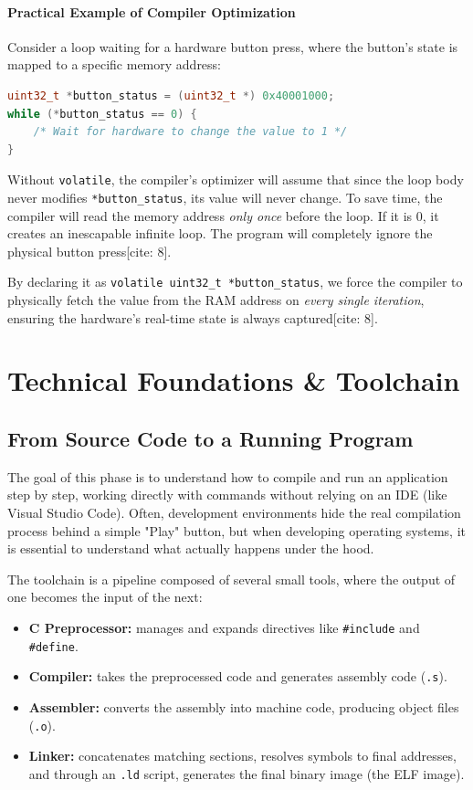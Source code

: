 \paragraph{Practical Example of Compiler Optimization}
Consider a loop waiting for a hardware button press, where the button's state is mapped to a specific memory address:
\begin{lstlisting}[language=c]
uint32_t *button_status = (uint32_t *) 0x40001000;
while (*button_status == 0) {
    /* Wait for hardware to change the value to 1 */
}
\end{lstlisting}
Without \texttt{volatile}, the compiler's optimizer will assume that since the loop body never modifies \texttt{*button\_status}, its value will never change. To save time, the compiler will read the memory address \textit{only once} before the loop. If it is 0, it creates an inescapable infinite loop. The program will completely ignore the physical button press[cite: 8].

By declaring it as \texttt{volatile uint32\_t *button\_status}, we force the compiler to physically fetch the value from the RAM address on \textit{every single iteration}, ensuring the hardware's real-time state is always captured[cite: 8].






\section{Technical Foundations \& Toolchain}

\subsection{From Source Code to a Running Program}
The goal of this phase is to understand how to compile and run an application step by step, working directly with commands without relying on an IDE (like Visual Studio Code). Often, development environments hide the real compilation process behind a simple "Play" button, but when developing operating systems, it is essential to understand what actually happens under the hood.

The toolchain is a pipeline composed of several small tools, where the output of one becomes the input of the next:
\begin{itemize}
    \item \textbf{C Preprocessor:} manages and expands directives like \texttt{\#include} and \texttt{\#define}.
    \item \textbf{Compiler:} takes the preprocessed code and generates assembly code (\texttt{.s}).
    \item \textbf{Assembler:} converts the assembly into machine code, producing object files (\texttt{.o}).
    \item \textbf{Linker:} concatenates matching sections, resolves symbols to final addresses, and through an \texttt{.ld} script, generates the final binary image (the ELF image).
\end{itemize}

